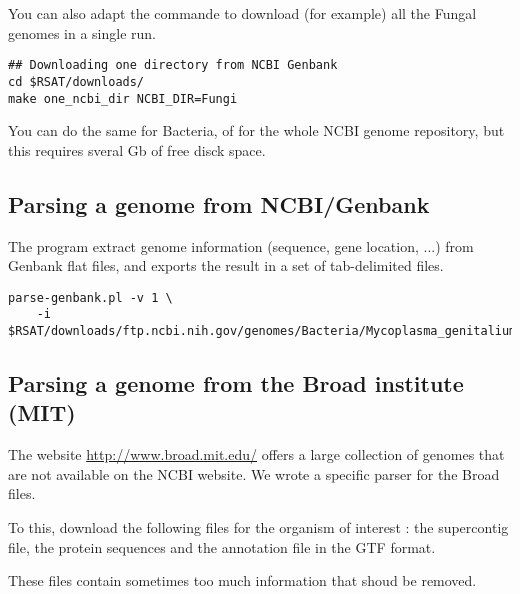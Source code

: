 You can also adapt the commande to download (for example) all the
Fungal genomes in a single run.

\begin{footnotesize}
\begin{verbatim}
## Downloading one directory from NCBI Genbank
cd $RSAT/downloads/
make one_ncbi_dir NCBI_DIR=Fungi
\end{verbatim}
\end{footnotesize}

You can do the same for Bacteria, of for the whole NCBI genome
repository, but this requires sveral Gb of free disck space.

\subsection{Parsing a genome from NCBI/Genbank}

The program  extract genome information
(sequence, gene location, ...) from Genbank flat files, and exports
the result in a set of tab-delimited files.

\begin{footnotesize}
\begin{verbatim}
parse-genbank.pl -v 1 \
    -i $RSAT/downloads/ftp.ncbi.nih.gov/genomes/Bacteria/Mycoplasma_genitalium 
\end{verbatim}
\end{footnotesize}

\subsection{Parsing a genome from the Broad institute (MIT)}

The website \url{http://www.broad.mit.edu/} offers a large collection of
genomes that are not available on the NCBI website. We wrote a specific parser 
for the Broad files.

To this, download the following files for the organism of interest : the supercontig file, the protein sequences and the annotation file in the GTF format.

These files contain sometimes too much information that shoud be removed. 

